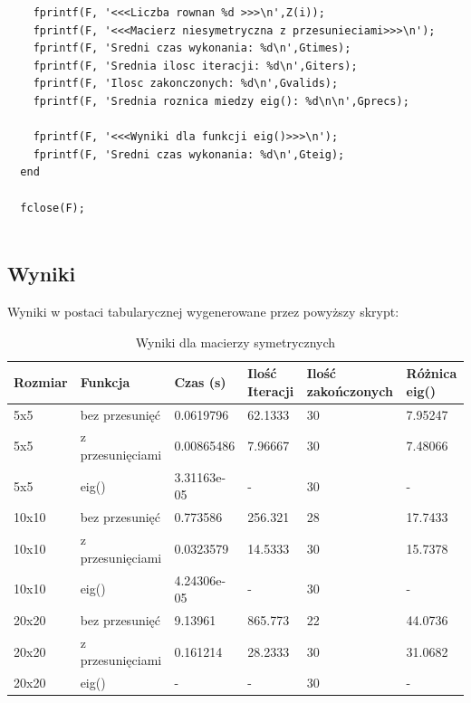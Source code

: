 \documentclass[a4paper, 11pt]{article}
\begin{document}
\begin{lstlisting}
    fprintf(F, '<<<Liczba rownan %d >>>\n',Z(i));
    fprintf(F, '<<<Macierz niesymetryczna z przesunieciami>>>\n');
    fprintf(F, 'Sredni czas wykonania: %d\n',Gtimes);
    fprintf(F, 'Srednia ilosc iteracji: %d\n',Giters);
    fprintf(F, 'Ilosc zakonczonych: %d\n',Gvalids);
    fprintf(F, 'Srednia roznica miedzy eig(): %d\n\n',Gprecs);
    
    fprintf(F, '<<<Wyniki dla funkcji eig()>>>\n');
    fprintf(F, 'Sredni czas wykonania: %d\n',Gteig);
  end
  
  fclose(F);
   
\end{lstlisting}
\vspace{1cm}


\subsection{Wyniki}
Wyniki w postaci tabularycznej wygenerowane przez powyższy skrypt:\\

\begin{table}[h]
\centering
\caption{Wyniki dla macierzy symetrycznych}
\begin{tabular}{|l|l|l|l|l|l|}
\hline
\textbf{Rozmiar} & \textbf{Funkcja} & \textbf{Czas (s)} & \textbf{Ilość Iteracji} & \textbf{Ilość zakończonych}
& \textbf{Różnica eig()}\\ \hline
5x5     & bez przesunięć   & 0.0619796   & 62.1333        & 30                 & 7.95247       \\ \hline
5x5     & z przesunięciami & 0.00865486  & 7.96667        & 30                 & 7.48066       \\ \hline
5x5     & eig()            & 3.31163e-05 & -              & 30                 & -             \\ \hline
10x10   & bez przesunięć   & 0.773586    & 256.321        & 28                 & 17.7433       \\ \hline
10x10   & z przesunięciami & 0.0323579   & 14.5333        & 30                 & 15.7378       \\ \hline
10x10   & eig()            & 4.24306e-05 & -              & 30                 & -             \\ \hline
20x20   & bez przesunięć   & 9.13961     & 865.773        & 22                 & 44.0736       \\ \hline
20x20   & z przesunięciami & 0.161214    & 28.2333        & 30                 & 31.0682       \\ \hline
20x20   & eig()            & -           & -              & 30                 & -             \\ \hline
\end{tabular}
\end{table}
\end{document}
